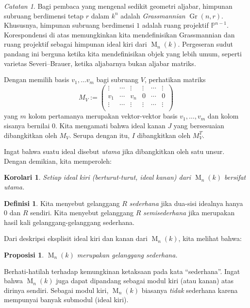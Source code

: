 \documentclass[12pt]{article}
\theoremstyle{plain}
\newtheorem{proposition}[theorem]{Proposisi}
\newtheorem{corollary}[theorem]{Korolari}
\theoremstyle{definition}
\newtheorem{definition}[theorem]{Definisi}
\theoremstyle{remark}
\newtheorem{remark}[theorem]{Catatan}
\numberwithin{equation}{section}
\begin{document}
\begin{remark}
Bagi pembaca yang mengenal sedikit geometri aljabar,
himpunan subruang berdimensi tetap $r$ dalam $k^n$ adalah
\emph{Grassmannian} $\operatorname{Gr}(n,r)$.
Khususnya, himpunan subruang berdimensi $1$ adalah ruang projektif
$\mathbb{P}^{n-1}$.
Korespondensi di atas memungkinkan kita mendefinisikan Grassmannian dan
ruang projektif sebagai himpunan ideal kiri dari $\operatorname{M}_n(k)$.
Pergeseran sudut pandang ini berguna ketika kita mendefinisikan objek yang
lebih umum, seperti varietas Severi--Brauer, ketika aljabarnya bukan aljabar
matriks.
\end{remark}

Dengan memilih basis $v_1,\ldots v_m$ bagi subruang $V$, perhatikan matriks
\[
M_V := \begin{pmatrix}
\vdots & \cdots & \vdots & \vdots & \cdots & \vdots\\
v_1 & \cdots & v_n & 0 & \cdots & 0\\
\vdots & \cdots & \vdots & \vdots & \cdots & \vdots\\
\end{pmatrix} 
\]
yang $m$ kolom pertamanya merupakan vektor-vektor basis $v_1,\ldots,v_m$ dan
kolom sisanya bernilai $0$.
Kita mengamati bahwa ideal kanan $J$ yang bersesuaian dibangkitkan oleh $M_V$.
Serupa dengan itu, $I$ dibangkitkan oleh $M_V^T$.

Ingat bahwa suatu ideal disebut \emph{utama}
jika dibangkitkan oleh satu unsur.
Dengan demikian, kita memperoleh:

\begin{corollary}
Setiap ideal kiri (berturut-turut, ideal kanan) dari $\operatorname{M}_n(k)$ bersifat utama.
\end{corollary}

\begin{definition}
Kita menyebut gelanggang $R$ \emph{sederhana} jika dua-sisi idealnya hanya $0$ dan
$R$ sendiri.
Kita menyebut gelanggang $R$ \emph{semisederhana} jika merupakan hasil kali
gelanggang-gelanggang sederhana.
\end{definition}

Dari deskripsi eksplisit ideal kiri dan kanan
dari $\operatorname{M}_n(k)$, kita melihat bahwa:

\begin{proposition}
$\operatorname{M}_n(k)$ merupakan gelanggang sederhana.
\end{proposition}

Berhati-hatilah terhadap kemungkinan ketaksaan pada kata
“sederhana”.
Ingat bahwa $\operatorname{M}_n(k)$ juga dapat dipandang sebagai modul kiri
(atau kanan) atas dirinya sendiri.
Sebagai modul kiri,
$\operatorname{M}_n(k)$ biasanya \emph{tidak} sederhana karena mempunyai banyak
submodul (ideal kiri).
\end{document}
